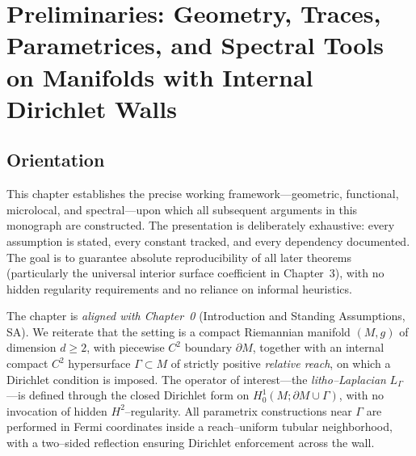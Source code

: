
\chapter{Preliminaries: Geometry, Traces, Parametrices, and Spectral Tools on Manifolds with Internal Dirichlet Walls}
\label{ch:preliminaries}

\section*{Orientation}
This chapter establishes the precise working framework—geometric, functional, microlocal, and spectral—upon which all subsequent arguments in this monograph are constructed. 
The presentation is deliberately exhaustive: every assumption is stated, every constant tracked, and every dependency documented. 
The goal is to guarantee absolute reproducibility of all later theorems (particularly the universal interior surface coefficient in Chapter~3), 
with no hidden regularity requirements and no reliance on informal heuristics.

The chapter is \emph{aligned with Chapter~0} (Introduction and Standing Assumptions, SA). 
We reiterate that the setting is a compact Riemannian manifold $(M,g)$ of dimension $d\ge2$, 
with piecewise $C^2$ boundary $\partial M$, together with an internal compact $C^2$ hypersurface $\Gamma\subset M$ of strictly positive \emph{relative reach}, 
on which a Dirichlet condition is imposed. 
The operator of interest—the \emph{litho–Laplacian} $L_\Gamma$—is defined through the closed Dirichlet form on 
$H^1_0(M;\partial M\cup\Gamma)$, 
with no invocation of hidden $H^2$–regularity. 
All parametrix constructions near $\Gamma$ are performed in Fermi coordinates inside a reach–uniform tubular neighborhood, 
with a two–sided reflection ensuring Dirichlet enforcement across the wall.

